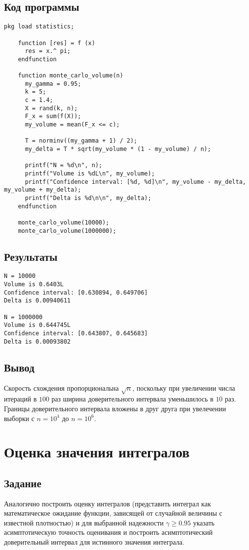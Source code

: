 \documentclass{article}
\begin{document}
        \subsection{Код программы}
\begin{lstlisting}[caption={volume.m}]
    pkg load statistics;
    
    function [res] = f (x)
      res = x.^ pi;
    endfunction
    
    function monte_carlo_volume(n)
      my_gamma = 0.95;
      k = 5;
      c = 1.4;
      X = rand(k, n);
      F_x = sum(f(X));
      my_volume = mean(F_x <= c);
      
      T = norminv((my_gamma + 1) / 2);
      my_delta = T * sqrt(my_volume * (1 - my_volume) / n);
      
      printf("N = %d\n", n);
      printf("Volume is %dL\n", my_volume);
      printf("Confidence interval: [%d, %d]\n", my_volume - my_delta, my_volume + my_delta);
      printf("Delta is %d\n\n", my_delta);
    endfunction
    
    monte_carlo_volume(10000);
    monte_carlo_volume(1000000);
\end{lstlisting}
        \subsection{Результаты}
\begin{verbatim}
N = 10000
Volume is 0.6403L
Confidence interval: [0.630894, 0.649706]
Delta is 0.00940611

N = 1000000
Volume is 0.644745L
Confidence interval: [0.643807, 0.645683]
Delta is 0.00093802
\end{verbatim}
        \subsection{Вывод}
            Скорость схождения пропорциональна $\sqrt{n}$, поскольку при увеличении числа итераций в $100$ раз ширина доверительного интервала уменьшилось в $10$ раз. Границы доверительного интервала вложены в друг друга при увелечении выборки с $n = 10^4$ до $n = 10^6$.
    \section{Оценка значения интегралов}
        \subsection{Задание}
            Аналогично построить оценку интегралов (представить интеграл как математическое ожидание функции, зависящей от случайной величины с известной плотностью) и для выбранной надежности $\gamma \geq 0.95$ указать асимптотическую точность оценивания и построить асимптотический доверительный интервал для истинного значения интеграла.
\end{document}

